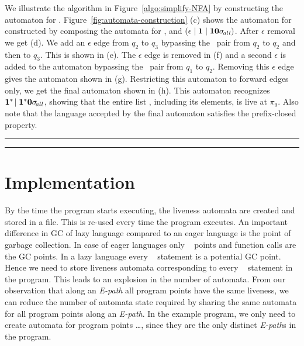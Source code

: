 \documentclass[9pt]{sigplanconf}
\newcommand{\comment}[1]{{\color{Myblue}{(#1)}}}
\begin{document}
\begin{enumerate}
\comment{change according to example}
We  illustrate  the  algorithm  in  Figure~\ref{algo:simplify-NFA}  by
constructing      the       automaton      for      .
Figure~\ref{fig:automata-construction}  (c)  shows  the automaton  for
   constructed   by   composing  the   automata   for
,  and $(\epsilon \mid \mathbf{1}
\mid \mathbf{1}\mathbf{0}\sigma_{\mathit{\!all}})$.  After $\epsilon$ removal we
get (d). We  add an $\epsilon$ edge from $q_2$  to $q_3$ bypassing the
\bcdr\acdr\ pair from $q_2$ to $q_2$  and then to $q_3$. This is shown
in (e).  The $\epsilon$ edge is removed in (f) and a second $\epsilon$
is added to the automaton bypassing the \bcar\acar\ pair from $q_1$ to
$q_2$.   Removing this $\epsilon$  edge gives  the automaton  shown in
(g).  Restricting  this automaton  to forward edges  only, we  get the
final   automaton   shown    in   (h).   This   automaton   recognizes
$\mathbf{1}^{*}\!\mid\mathbf{1}^{*}\mathbf{0}  \sigma_{\mathit \!all}$,  showing that
the entire list \py, including  its elements, is live at $\pi_9$. Also
note that the  language accepted by the final  automaton satisfies the
prefix-closed property.


\hrule
\hrule



\section{Implementation}
By the  time the program  starts executing, the liveness  automata are
created and stored in a file.   This is re-used every time the program
executes.  An important difference in  GC of lazy language compared to
an  eager language is  the point  of garbage  collection.  In  case of
eager  languages only  \CONS~ points  and  function calls  are the  GC
points. In  a lazy  language every \LET~  statement is a  potential GC
point. Hence we need to store liveness automata corresponding to every
\LET~  statement in the  program. This  leads to  an explosion  in the
number of  automata. \comment{Directly say that we share the automata}From our  observation that along an  {\em E-path}
all program points have the same liveness, we can reduce the number of
automata state required  by sharing the same automata  for all program
points along an {\em E-path}. In  the example program, we only need to
create automata  for program  points \ldots, since  they are  the only
distinct {\em E-path}s in the program.


\end{enumerate}
\end{document}
